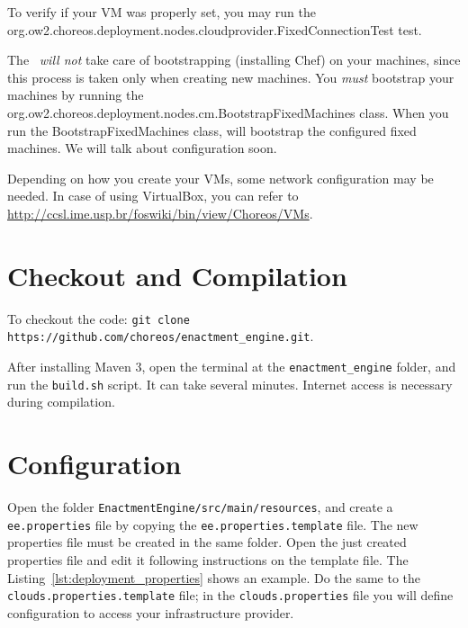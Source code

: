To verify if your VM was properly set, you may run the \\ \textsf{org.ow2.choreos.deployment.nodes.cloudprovider.FixedConnectionTest} test.

The \ee\ \emph{will not} take care of bootstrapping (installing Chef) on your machines, since this process is taken only when creating new machines. 
You \emph{must} bootstrap your machines by running the \textsf{org.ow2.choreos.deployment.nodes.cm.BootstrapFixedMachines} class.
When you run the \textsf{BootstrapFixedMachines} class, \ee will bootstrap the configured fixed machines. We will talk about configuration soon.

Depending on how you create your VMs, some network configuration may be needed. In case of using VirtualBox, you can refer to \url{http://ccsl.ime.usp.br/foswiki/bin/view/Choreos/VMs}.


\section{Checkout and Compilation}

To checkout the code: \texttt{git clone https://github.com/choreos/enactment\_engine.git}. 

After installing Maven 3, open the terminal at the \texttt{enactment\_engine} folder, and run the \texttt{build.sh} script. It can take several minutes. Internet access is necessary during compilation.

\section{Configuration}

Open the folder \texttt{EnactmentEngine/src/main/resources}, and create a \texttt{ee.properties} file by copying the \texttt{ee.properties.template} file. The new properties file must be created in the same folder. Open the just created properties file and edit it following instructions on the template file. The Listing~\ref{lst:deployment_properties} shows an example. Do the same to the \texttt{clouds.properties.template} file; in the \texttt{clouds.properties} file you will define configuration to access your infrastructure provider.

\lstset{
numbers=left
}

